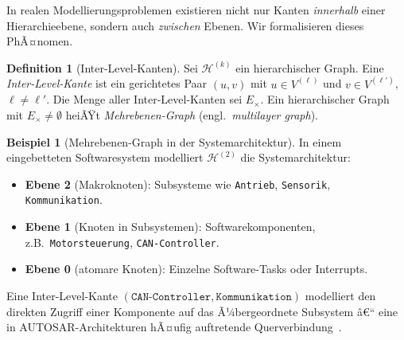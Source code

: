 ﻿\documentclass[12pt,a4paper,twoside]{article}
\theoremstyle{definition}
\newtheorem{definition}{Definition}[section]
\newtheorem{beispiel}{Beispiel}[section]
\theoremstyle{plain}
\theoremstyle{remark}
\begin{document}
In realen Modellierungsproblemen existieren nicht nur Kanten
\emph{innerhalb} einer Hierarchieebene, sondern auch \emph{zwischen}
Ebenen.  Wir formalisieren dieses PhÃ¤nomen.

\begin{definition}[Inter-Level-Kanten]
	\label{def:interlevel}
	Sei $\mathcal{H}^{(k)}$ ein hierarchischer Graph.  Eine
	\emph{Inter-Level-Kante} ist ein gerichtetes Paar $(u, v)$ mit
	$u \in V^{(\ell)}$ und $v \in V^{(\ell')}$, $\ell \neq \ell'$.
	Die Menge aller Inter-Level-Kanten sei $E_{\times}$.  Ein
	hierarchischer Graph mit $E_{\times} \neq \emptyset$ heiÃŸt
	\emph{Mehrebenen-Graph} (engl.\ \emph{multilayer graph}).
\end{definition}

\begin{beispiel}[Mehrebenen-Graph in der Systemarchitektur]
	In einem eingebetteten Softwaresystem modelliert $\mathcal{H}^{(2)}$
	die Systemarchitektur:
	\begin{itemize}
		\item \textbf{Ebene 2} (Makroknoten): Subsysteme wie
		\texttt{Antrieb}, \texttt{Sensorik}, \texttt{Kommunikation}.
		\item \textbf{Ebene 1} (Knoten in Subsystemen): Softwarekomponenten,
		z.B.\ \texttt{Motorsteuerung}, \texttt{CAN-Controller}.
		\item \textbf{Ebene 0} (atomare Knoten): Einzelne Software-Tasks
		oder Interrupts.
	\end{itemize}
	Eine Inter-Level-Kante $(\texttt{CAN-Controller}, \texttt{Kommunikation})$
	modelliert den direkten Zugriff einer Komponente auf das Ã¼bergeordnete
	Subsystem â€“ eine in AUTOSAR-Architekturen hÃ¤ufig auftretende
	Querverbindung~\cite{West2001}.
\end{beispiel}
\end{document}
